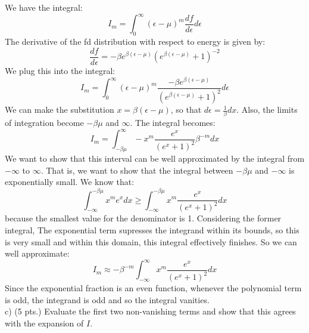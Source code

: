 \documentclass[12pt]{article}
\begin{document}
\subsection{}
We have the integral:
\begin{equation}
  I_m = \int_{0}^{\infty} (\epsilon - \mu)^m \frac{df}{d\epsilon} d\epsilon
\end{equation}
The derivative of the fd distribution with respect to energy is given by:
\begin{equation}
  \frac{df}{d\epsilon} = -\beta e^{\beta \left(\epsilon - \mu\right)} \left(e^{\beta \left(\epsilon - \mu\right)} + 1\right)^{-2}
\end{equation}
We plug this into the integral:
\begin{equation}
  I_m = \int_{0}^{\infty} (\epsilon - \mu)^m \frac{-\beta e^{\beta \left(\epsilon - \mu\right)}}{\left(e^{\beta \left(\epsilon - \mu\right)} + 1\right)^2} d\epsilon
\end{equation}
We can make the substitution $x = \beta(\epsilon - \mu)$, so that $d\epsilon = \frac{1}{\beta} dx$. Also, the limits of integration become $-\beta\mu$ and $\infty$. The integral becomes:
\begin{equation}
  I_m = \int_{-\beta\mu}^{\infty} -x^m \frac{e^{x}}{\left(e^{x} + 1\right)^2} \beta ^{-m} dx
\end{equation}
We want to show that this interval can be well approximated by the integral from $-\infty$ to $\infty$. That is, we want to show that the integral between $-\beta \mu$ and $-\infty$ is exponentially small. We know that:
\begin{equation}
  \int_{-\infty}^{-\beta \mu} x^m e^x dx \geq \int_{-\infty}^{-\beta \mu} x^m \frac{e^x}{(e^x + 1)^2} dx
\end{equation}
because the smallest value for the denominator is 1.
Considering the former integral, The exponential term supresses the integrand within its bounds, so this is very small and within this domain, this integral effectively finishes. So we can well approximate:
\begin{equation}
  I_m \approx - \beta ^{-m}\int_{-\infty}^{\infty} x^m \frac{e^{x}}{\left(e^{x} + 1\right)^2} dx
\end{equation}
Since the exponential fraction is an even function, whenever the polynomial term is odd, the integrand is odd and so the integral vanities.\\
c) (5 pts.) Evaluate the first two non-vanishing terms and show that this agrees with the expansion of $I$.
\end{document}
